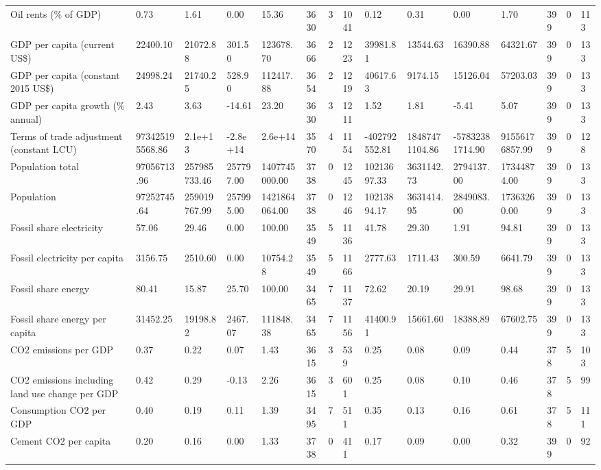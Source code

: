 \begin{longtable}{lllllllllllllll}
Oil rents (\% of GDP) & 0.73 & 1.61 & 0.00 & 15.36 & 3630 & 3 & 1041 & 0.12 & 0.31 & 0.00 & 1.70 & 399 & 0 & 113\\
GDP per capita (current US\$) & 22400.10 & 21072.88 & 301.50 & 123678.70 & 3666 & 2 & 1223 & 39981.81 & 13544.63 & 16390.88 & 64321.67 & 399 & 0 & 133\\
GDP per capita (constant 2015 US\$) & 24998.24 & 21740.25 & 528.90 & 112417.88 & 3654 & 2 & 1219 & 40617.63 & 9174.15 & 15126.04 & 57203.03 & 399 & 0 & 133\\
GDP per capita growth (\% annual) & 2.43 & 3.63 & -14.61 & 23.20 & 3630 & 3 & 1211 & 1.52 & 1.81 & -5.41 & 5.07 & 399 & 0 & 133\\
\addlinespace
Terms of trade adjustment (constant LCU) & 973425195568.86 & 2.1e+13 & -2.8e+14 & 2.6e+14 & 3570 & 4 & 1154 & -402792552.81 & 18487471104.86 & -57832381714.90 & 91556176857.99 & 399 & 0 & 128\\
Population total & 97056713.96 & 257985733.46 & 257797.00 & 1407745000.00 & 3738 & 0 & 1245 & 10213697.33 & 3631142.73 & 2794137.00 & 17344874.00 & 399 & 0 & 133\\
Population & 97252745.64 & 259019767.99 & 257995.00 & 1421864064.00 & 3738 & 0 & 1246 & 10213894.17 & 3631414.95 & 2849083.00 & 17363260.00 & 399 & 0 & 133\\
Fossil share electricity & 57.06 & 29.46 & 0.00 & 100.00 & 3549 & 5 & 1136 & 41.78 & 29.30 & 1.91 & 94.81 & 399 & 0 & 133\\
Fossil electricity per capita & 3156.75 & 2510.60 & 0.00 & 10754.28 & 3549 & 5 & 1166 & 2777.63 & 1711.43 & 300.59 & 6641.79 & 399 & 0 & 133\\
\addlinespace
Fossil share energy & 80.41 & 15.87 & 25.70 & 100.00 & 3465 & 7 & 1137 & 72.62 & 20.19 & 29.91 & 98.68 & 399 & 0 & 133\\
Fossil share energy per capita & 31452.25 & 19198.82 & 2467.07 & 111848.38 & 3465 & 7 & 1156 & 41400.91 & 15661.60 & 18388.89 & 67602.75 & 399 & 0 & 133\\
CO2 emissions per GDP & 0.37 & 0.22 & 0.07 & 1.43 & 3615 & 3 & 539 & 0.25 & 0.08 & 0.09 & 0.44 & 378 & 5 & 103\\
CO2 emissions including land use change per GDP & 0.42 & 0.29 & -0.13 & 2.26 & 3615 & 3 & 601 & 0.25 & 0.08 & 0.10 & 0.46 & 378 & 5 & 99\\
Consumption CO2 per GDP & 0.40 & 0.19 & 0.11 & 1.39 & 3495 & 7 & 511 & 0.35 & 0.13 & 0.16 & 0.61 & 378 & 5 & 111\\
\addlinespace
Cement CO2 per capita & 0.20 & 0.16 & 0.00 & 1.33 & 3738 & 0 & 411 & 0.17 & 0.09 & 0.00 & 0.32 & 399 & 0 & 92\\

\end{longtable}
